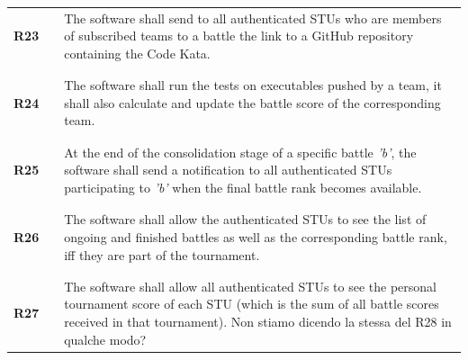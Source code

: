 \begin{longtable}[H]{l l p{12cm}}
    \textbf{R23} & \vline & The software shall send to all authenticated STUs who are members of subscribed teams to a battle the link to a GitHub repository containing the Code Kata.                                                                 \\
                 &        &                                                                                                                                                                                                                             \\\hline & & \\   
    \textbf{R24} & \vline & The software shall run the tests on executables pushed by a team, it shall also calculate and update the battle score of the corresponding team.                                                                            \\
                 &        &                                                                                                                                                                                                                             \\\hline & & \\   
    \textbf{R25} & \vline & At the end of the consolidation stage of a specific battle \textit{'b'}, the software shall send a notification to all authenticated STUs participating to \textit{'b'} when the final battle rank becomes available.       \\
                 &        &                                                                                                                                                                                                                             \\\hline & & \\   
    \textbf{R26} & \vline & The software shall allow the authenticated STUs to see the list of ongoing and finished battles as well as the corresponding battle rank, iff they are part of the tournament.                                              \\
                 &        &                                                                                                                                                                                                                             \\\hline & & \\   
    \textbf{R27} & \vline & The software shall allow all authenticated STUs to see the personal tournament score of each STU (which is the sum of all battle scores received in that tournament). {\color{red} Non stiamo dicendo la stessa del R28 in qualche modo?}\\

\end{longtable}
